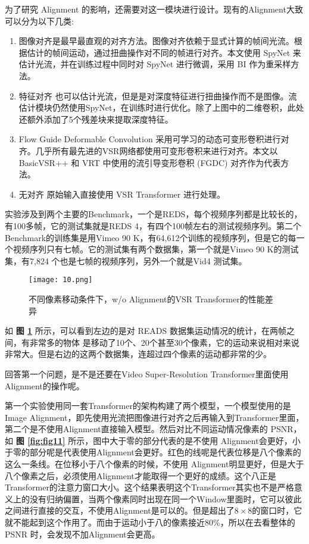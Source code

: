 为了研究 Alignment 的影响，还需要对这一模块进行设计。现有的Alignment大致可以分为以下几类:
\begin{enumerate}
	\item 图像对齐是最早最直观的对齐方法。图像对齐依赖于显式计算的帧间光流。根据估计的帧间运动，通过扭曲操作对不同的帧进行对齐。本文使用 SpyNet 来估计光流，并在训练过程中同时对 SpyNet 进行微调，采用 BI 作为重采样方法。
	\item 特征对齐 也可以估计光流，但是是对深度特征进行扭曲操作而不是图像。流估计模块仍然使用SpyNet，在训练时进行优化。除了上图中的二维卷积，此处还额外添加了5个残差块来提取深度特征。
	\item Flow Guide Deformable Convolution 采用可学习的动态可变形卷积进行对齐。几乎所有最先进的VSR网络都使用可变形卷积来进行对齐。本文以 BasicVSR++ 和 VRT 中使用的流引导变形卷积 (FGDC) 对齐作为代表方法。
	\item 无对齐 原始输入直接使用 VSR Transformer 进行处理。
\end{enumerate}


实验涉及到两个主要的Benchmark，一个是REDS，每个视频序列都是比较长的，有100多帧，它的测试集就是REDS 4，有四个100帧左右的测试视频序列。第二个Benchmark的训练集是用Vimeo 90 K，有64,612个训练的视频序列，但是它的每一个视频序列只有七帧。它的测试集有两个数据集，第一个就是Vimeo 90 K的测试集，有7,824 个也是七帧的视频序列，另外一个就是Vid4 测试集。

\begin{figure}[!tbp]
\centering
\texttt{[image: 10.png]}	
\caption{不同像素移动条件下，w/o Alignment的VSR Transformer的性能差异}
\label{fig:fig10}
\end{figure}


如 \textbf{图 \ref{fig:fig10}} 所示，可以看到左边的是对 READS 数据集运动情况的统计，在两帧之间，有非常多的物体
是移动了10个、20个甚至30个像素，它的运动来说相对来说非常大。但是右边的这两个数据集，连超过四个像素的运动都非常的少。

回答第一个问题，是不是还要在Video Super-Resolution Transformer里面使用 Alignment的操作呢。

第一个实验使用同一套Transformer的架构构建了两个模型，一个模型使用的是Image Alignment，即先使用光流把图像进行对齐之后再输入到Transformer里面，第二个是不使用Alignment直接输入模型。然后对比不同运动情况像素的 PSNR，如 \textbf{图 \ref{fig:fig11}} 所示，图中大于零的部分代表的是不使用 Alignment会更好，小于零的部分呢是代表使用Alignment会更好。红色的线呢是代表位移是八个像素的这么一条线。在位移小于八个像素的时候，不使用 Alignment明显更好，但是大于八个像素之后，必须使用Alignment才能取得一个更好的成绩。这个八正是Transformer的注意力窗口大小。这个结果表明这个Transformer其实也不是严格意义上的没有归纳偏置，当两个像素同时出现在同一个Window里面时，它可以彼此之间进行直接的交互，不使用Alignment是可以的。但是超出了$8\times 8$的窗口时，它就不能起到这个作用了。而由于运动小于八的像素接近80\%，所以在去看整体的 PSNR 时，会发现不加Alignment会更高。


